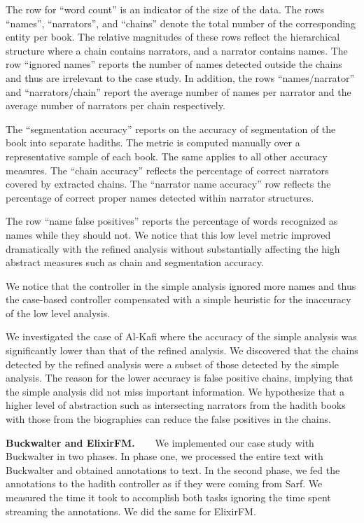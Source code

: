 \documentclass[11pt]{article}
\begin{document}
The row for ``word count'' is an indicator of the size of the data.
The %
rows ``names'', ``narrators'', and ``chains'' denote the total
number of the corresponding entity per book.
The relative magnitudes of these rows
reflect the hierarchical structure where 
a chain contains
narrators, and a narrator contains names.
The row ``ignored names'' reports the number of names detected 
outside the chains and thus are irrelevant to
the case study.
In addition, the rows ``names/narrator'' and ``narrators/chain'' 
report the average
number of names per narrator and 
the average number of narrators per chain respectively. 

The ``segmentation accuracy'' reports on the accuracy of 
segmentation of the book into separate hadiths.
The metric is computed manually over a representative sample 
of each book.
The same applies to all other accuracy measures.
The ``chain accuracy'' reflects the percentage of correct narrators 
covered by extracted chains.
The ``narrator name accuracy'' row reflects the percentage of 
correct proper names detected within
narrator structures.

The row ``name false positives'' reports the percentage of words 
recognized as names while they should not.
We notice that this low level metric improved dramatically 
with the refined analysis without substantially affecting the 
high abstract measures such as chain and segmentation
accuracy.

We notice that the controller in the simple analysis ignored 
more names and thus the case-based
controller compensated with a simple heuristic
for the inaccuracy of the low level 
analysis.

We investigated the case of Al-Kafi where the accuracy of 
the simple analysis was significantly lower than that of the 
refined analysis. 
We discovered that the chains detected by the refined analysis 
were a subset of those detected by the simple
analysis. 
The reason for the lower accuracy is false positive chains, 
implying that the simple analysis did not miss important 
information. 
We hypothesize that a higher level of abstraction such as 
intersecting narrators from the hadith books with those from
the biographies can reduce the false positives in the chains.

{\bf Buckwalter and ElixirFM.~~~}
We implemented our case study with Buckwalter in two phases. 
In phase one, we processed the entire text with Buckwalter and
obtained annotations to text. 
In the second phase, we fed the annotations to 
the hadith controller as if they were coming from Sarf. 
We measured the time it took to accomplish both tasks
ignoring the time spent streaming the annotations.
We did the same for ElixirFM. 
\end{document}
